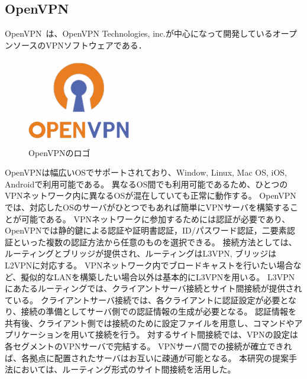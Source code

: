 \subsection{OpenVPN}

OpenVPN~\cite{OpenVPN}は、OpenVPN Technologies, inc.が中心になって開発しているオープンソースのVPNソフトウェアである．

\begin{figure}[htbp]
\begin{center}
    \includegraphics[width=0.4\textwidth]{./figures/openvpn-logo.png}
    \caption{OpenVPNのロゴ}
\end{center}
\end{figure}

OpenVPNは幅広いOSでサポートされており、Window, Linux, Mac OS, iOS, Androidで利用可能である。
異なるOS間でも利用可能であるため、ひとつのVPNネットワーク内に異なるOSが混在していても正常に動作する。
OpenVPNでは、対応したOSのサーバがひとつでもあれば簡単にVPNサーバを構築することが可能である。
VPNネットワークに参加するためには認証が必要であり、OpenVPNでは静的鍵による認証や証明書認証，ID/パスワード認証，二要素認証といった複数の認証方法から任意のものを選択できる。
接続方法としては、ルーティングとブリッジが提供され、ルーティングはL3VPN, ブリッジはL2VPNに対応する。
VPNネットワーク内でブロードキャストを行いたい場合など、擬似的なLANを構築したい場合以外は基本的にL3VPNを用いる。
L3VPNにあたるルーティングでは、クライアントサーバ接続とサイト間接続が提供されている。
クライアントサーバ接続では、各クライアントに認証設定が必要となり、接続の準備としてサーバ側での認証情報の生成が必要となる。
認証情報を共有後、クライアント側では接続のために設定ファイルを用意し、コマンドやアプリケーションを用いて接続を行う。
対するサイト間接続では、VPNの設定は各セグメントのVPNサーバで完結する。
VPNサーバ間での接続が確立できれば、各拠点に配置されたサーバはお互いに疎通が可能となる。
本研究の提案手法においては、ルーティング形式のサイト間接続を活用した。